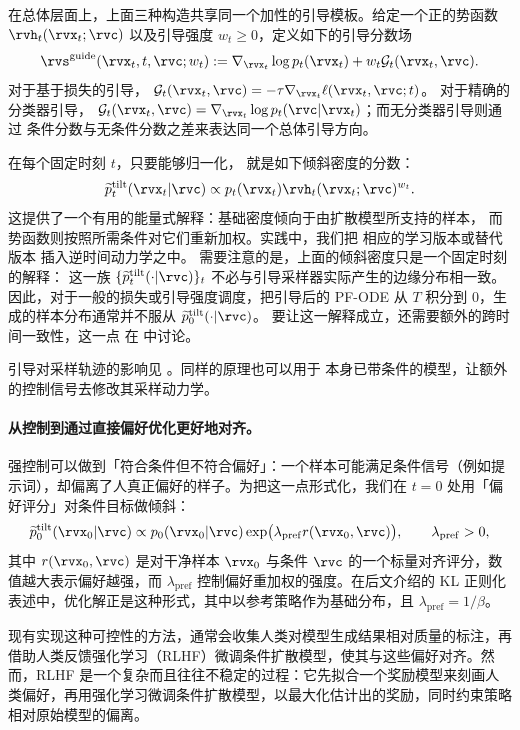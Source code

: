 在总体层面上，上面三种构造共享同一个加性的引导模板。给定一个正的势函数
$\rvh_t(\rvx_t;\rvc)$ 以及引导强度 $w_t\geq0$，定义如下的引导分数场
\begin{align}
\rvs^{\mathrm{guide}}(\rvx_t,t,\rvc;w_t)
:=
\nabla_{\rvx_t}\log p_t(\rvx_t)
+
w_t\mathcal{G}_t(\rvx_t,\rvc).
\label{eq:generic-guided-score}
\end{align}
对于基于损失的引导，
$\mathcal{G}_t(\rvx_t,\rvc)
=-\tau\nabla_{\rvx_t}\ell(\rvx_t,\rvc;t)$。
对于精确的分类器引导，
$\mathcal{G}_t(\rvx_t,\rvc)
=\nabla_{\rvx_t}\log p_t(\rvc|\rvx_t)$；而无分类器引导则通过
条件分数与无条件分数之差来表达同一个总体引导方向。

在每个固定时刻 $t$，只要能够归一化， 就是如下倾斜密度的分数：
\[
\widetilde p_t^{\mathrm{tilt}}(\rvx_t|\rvc)
\propto
p_t(\rvx_t)\rvh_t(\rvx_t;\rvc)^{w_t}.
\]
这提供了一个有用的能量式解释：基础密度倾向于由扩散模型所支持的样本，
而势函数则按照所需条件对它们重新加权。实践中，我们把  相应的学习版本或替代版本
插入逆时间动力学之中。
需要注意的是，上面的倾斜密度只是一个固定时刻的解释：
这一族
$\{\widetilde p_t^{\mathrm{tilt}}(\cdot|\rvc)\}_t$
不必与引导采样器实际产生的边缘分布相一致。
因此，对于一般的损失或引导强度调度，把引导后的
PF-ODE 从 $T$ 积分到 $0$，生成的样本分布通常并不服从
$\widetilde p_0^{\mathrm{tilt}}(\cdot|\rvc)$。
要让这一解释成立，还需要额外的跨时间一致性，这一点
在  中讨论。


引导对采样轨迹的影响见
。同样的原理也可以用于
本身已带条件的模型，让额外的控制信号去修改其采样动力学。


\paragraph{从控制到通过直接偏好优化更好地对齐。}

强控制可以做到「符合条件但不符合偏好」：一个样本可能满足条件信号（例如提示词），却偏离了人真正偏好的样子。为把这一点形式化，我们在 $t=0$ 处用「偏好评分」对条件目标做倾斜：
\[
\widetilde p_0^{\mathrm{tilt}}(\rvx_0|\rvc)
\propto
p_0(\rvx_0|\rvc)
\exp\bigl(
\lambda_{\mathrm{pref}} r(\rvx_0,\rvc)
\bigr),
\qquad
\lambda_{\mathrm{pref}}>0,
\]
其中 $r(\rvx_0,\rvc)$ 是对干净样本
$\rvx_0$ 与条件 $\rvc$ 的一个标量对齐评分，数值越大表示偏好越强，而 $\lambda_{\mathrm{pref}}$ 控制偏好重加权的强度。在后文介绍的 KL 正则化表述中，优化解正是这种形式，其中以参考策略作为基础分布，且 $\lambda_{\mathrm{pref}}=1/\beta$。


现有实现这种可控性的方法，通常会收集人类对模型生成结果相对质量的标注，再借助人类反馈强化学习（RLHF）微调条件扩散模型，使其与这些偏好对齐。然而，RLHF 是一个复杂而且往往不稳定的过程：它先拟合一个奖励模型来刻画人类偏好，再用强化学习微调条件扩散模型，以最大化估计出的奖励，同时约束策略相对原始模型的偏离。

